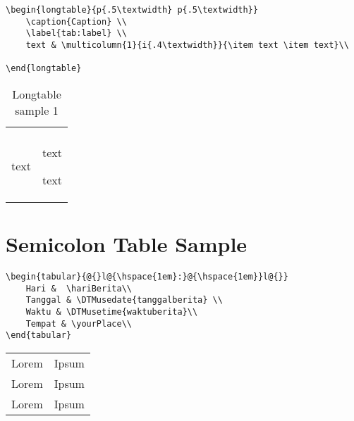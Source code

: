\documentclass[12pt]{article}
\begin{document}
\begin{lstlisting}
\begin{longtable}{p{.5\textwidth} p{.5\textwidth}}
	\caption{Caption} \\
	\label{tab:label} \\
	text & \multicolumn{1}{i{.4\textwidth}}{\item text \item text}\\

\end{longtable}
\end{lstlisting}
\begin{longtable}{p{} p{}}
	\caption{Longtable sample 1} \\
	\label{tab:label} \\
	text & \multicolumn{1}{i{.4\textwidth}}{\item text \item text}\\

\end{longtable}

\section{Semicolon Table Sample}
\begin{lstlisting}
\begin{tabular}{@{}l@{\hspace{1em}:}@{\hspace{1em}}l@{}}
    Hari &  \hariBerita\\
    Tanggal & \DTMusedate{tanggalberita} \\
    Waktu & \DTMusetime{waktuberita}\\
    Tempat & \yourPlace\\
\end{tabular}
\end{lstlisting}
\begin{tabular}{@{}l@{\hspace{1em}:}@{\hspace{1em}}l@{}}
    Lorem &  Ipsum\\
    Lorem &  Ipsum\\
    Lorem &  Ipsum\\
\end{tabular}
\end{document}
